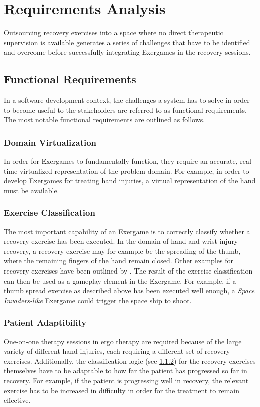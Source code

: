\section{Requirements Analysis}
\label{sec:reqanalysis}
Outsourcing recovery exercises into a space where no direct therapeutic supervision is available generates a series of challenges that have to be identified and overcome before successfully integrating Exergames in the recovery sessions. 

\subsection{Functional Requirements}
In a software development context, the challenges a system has to solve in order to become useful to the stakeholders are referred to as functional requirements.  The most notable functional requirements are outlined as follows.

\subsubsection{Domain Virtualization}
In order for Exergames to fundamentally function, they require an accurate, real-time virtualized representation of the problem domain. For example, in order to develop Exergames for treating hand injuries, a virtual representation of the hand must be available.

\subsubsection{Exercise Classification}
\label{sec:exercise-classification}
The most important capability of an Exergame is to correctly classify whether a recovery exercise has been executed. In the domain of hand and wrist injury recovery, a recovery exercise may for example be the spreading of the thumb, where the remaining fingers of the hand remain closed. Other examples for recovery exercises have been outlined by \cite{StudiArbeitVolzBaumotte}. The result of the exercise classification can then be used as a gameplay element in the Exergame. For example, if a thumb spread exercise as described above has been executed well enough, a \emph{Space Invaders-like} Exergame could trigger the space ship to shoot.

\subsubsection{Patient Adaptibility}
One-on-one therapy sessions in ergo therapy are required because of the large variety of different hand injuries, each requiring a different set of recovery exercises. Additionally, the classification logic (see \ref{sec:exercise-classification}) for the recovery exercises themselves have to be adaptable to how far the patient has progressed so far in recovery. For example, if the patient is progressing well in recovery, the relevant exercise has to be increased in difficulty in order for the treatment to remain effective.

